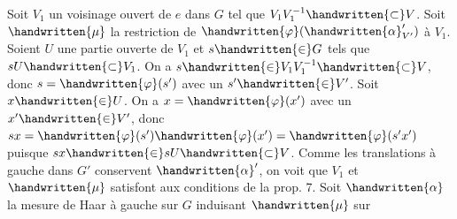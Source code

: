 Soit $V_1$ un voisinage ouvert de $e$ dans $G$ tel que $V_1V_1^{-1}\handwritten{\subset} V$. Soit $\handwritten{\mu}$ la restriction de $\handwritten{\varphi}(\handwritten{\alpha}'_{V'})$ à $V_1$. Soient $U$ une partie ouverte de $V_1$ et $s\handwritten{\in} G$ tels que $sU\handwritten{\subset} V_1$.
On a $s\handwritten{\in} V_1V_1^{-1}\handwritten{\subset} V$, donc $s=\handwritten{\varphi}(s')$ avec un $s'\handwritten{\in} V'$. Soit $x\handwritten{\in} U$. On a $x=\handwritten{\varphi}(x')$
avec un $x'\handwritten{\in} V'$, donc $sx=\handwritten{\varphi}(s')\handwritten{\varphi}(x')=\handwritten{\varphi}(s'x')$ puisque $sx\handwritten{\in} sU\handwritten{\subset} V$. Comme les
translations à gauche dans $G'$ conservent $\handwritten{\alpha}'$, on voit que $V_1$ et $\handwritten{\mu}$ satisfont aux
conditions de la prop. 7. Soit $\handwritten{\alpha}$ la mesure de Haar à gauche sur $G$ induisant $\handwritten{\mu}$ sur
